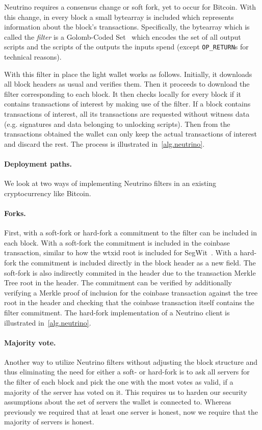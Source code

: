 Neutrino requires a consensus change or soft fork, yet to occur for Bitcoin. With this change, in every block a small bytearray is included which represents information about the block's transactions. Specifically, the bytearray which is called the \emph{filter} is a Golomb-Coded Set~\cite{golomb1966run}
which encodes the set of all output scripts and the scripts of the outputs the inputs spend (except \texttt{OP\_RETURN}s for technical reasons).

With this filter in place the light wallet works as follows. Initially, it downloads all block headers as usual and verifies them. Then it proceeds to download the filter corresponding to each block. It then checks locally for every block if it contains transactions of interest by making use of the filter. If a block contains transactions of interest, all its transactions are requested without witness data (e.g. signatures and data belonging to unlocking scripts). Then from the transactions obtained the wallet can only keep the actual transactions of interest and discard the rest. The process is illustrated in~\cref{alg.neutrino}.

\paragraph{Deployment paths.}
We look at two ways of implementing Neutrino filters in an existing cryptocurrency like Bitcoin.

\paragraph{Forks.}
First, with a soft-fork or hard-fork a commitment to the filter can be included in each block. With a soft-fork the commitment is included in the coinbase transaction, similar to how the wtxid root is included for SegWit~\cite{segwit}. With a hard-fork the commitment is included directly in the block header as a new field. The soft-fork is also indirectly commited in the header due to the transaction Merkle Tree root in the header. The commitment can be verified by additionally verifying a Merkle proof of inclusion for the coinbase transaction against the tree root in the header and checking that the coinbase transaction itself contains the filter commitment. The hard-fork implementation of a Neutrino client is illustrated in~\cref{alg.neutrino}.

\paragraph{Majority vote.}
Another way to utilize Neutrino filters without adjusting the block structure and thus eliminating the need for either a soft- or hard-fork is to ask all servers for the filter of each block and pick the one with the most votes as valid, if a majority of the server has voted on it. This requires us to harden our security assumptions about the set of servers the wallet is connected to. Whereas previously we required that at least one server is honest, now we require that the majority of servers is honest.

